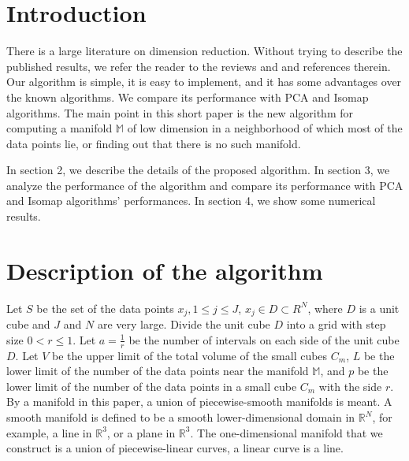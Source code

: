 \documentclass[12pt]{article}
\theoremstyle{plain}
\begin{document}


\section{Introduction} \label{Introduction}

\noindent There is a large literature on dimension reduction. Without trying to describe the published results, we refer the reader to the reviews \cite{Fodor} and \cite{Maaten} and references therein. Our algorithm is simple, it is easy to implement, and it has some advantages over the known algorithms. We compare its performance with PCA and Isomap algorithms. The main point in this short paper is the new algorithm for computing a manifold $\mathbb{M}$ of low dimension in a neighborhood of which most of the data points lie, or finding out that there is no such manifold.

\noindent In section 2, we describe the details of the proposed algorithm. In section 3, we analyze the performance of the algorithm and compare its performance with PCA and Isomap algorithms' performances. In section 4, we show some numerical results.

\section{Description of the algorithm} \label{Description of the algorithm}

\noindent Let $S$ be the set of the data points $x_j, 1 \leq j \leq J$, $x_j \in D \subset R^N$, where $D$ is a unit cube and $J$ and $N$ are very large. Divide the unit cube $D$
into a grid with step size $0 < r \leq 1$. Let $a = \frac{1}{r}$ be the number of intervals on each side of the unit cube $D$. Let $V$ be the upper
limit of the total volume of the small cubes $C_m$, $L$ be the lower limit of the number of the data points near the manifold $\mathbb{M}$, and $p$ be the lower limit of the
number of the data points in a small cube $C_m$ with the side $r$. By a manifold in this paper, a union of piecewise-smooth manifolds is meant. A smooth manifold is defined to be a smooth lower-dimensional domain in $\mathbb{R}^N$, for example, a line in $\mathbb{R}^3$, or a plane in $\mathbb{R}^3$. The one-dimensional manifold that we construct is a union of piecewise-linear curves, a linear curve is a line.
\end{document}

